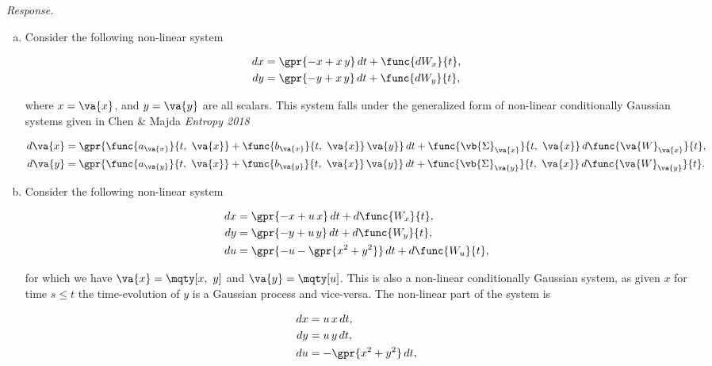\textit{Response.}

\begin{enumerate}[(a)]

	\item Consider the following non-linear system
	
	\begin{subequations}
		\begin{align}
			dx &= \gpr{-x + x\,y}\,dt + \func{dW_{x}}{t},\\
			dy &= \gpr{-y + x\,y}\,dt + \func{dW_{y}}{t},
		\end{align}
	\end{subequations}
	
	where $x = \va{x}$, and $y = \va{y}$ are all scalars. This system falls under the generalized form of non-linear conditionally Gaussian systems given in Chen \& Majda \textit{Entropy 2018}
	
	\begin{subequations}
		\begin{align}
			d\va{x} &= \gpr{\func{a_{\va{x}}}{t,\ \va{x}} + \func{b_{\va{x}}}{t,\ \va{x}}\,\va{y}}\,dt + \func{\vb{\Sigma}_{\va{x}}}{t,\ \va{x}}\,d\func{\va{W}_{\va{x}}}{t},\\
			d\va{y} &= \gpr{\func{a_{\va{y}}}{t,\ \va{x}} + \func{b_{\va{y}}}{t,\ \va{x}}\,\va{y}}\,dt + \func{\vb{\Sigma}_{\va{y}}}{t,\ \va{x}}\,d\func{\va{W}_{\va{y}}}{t}.
		\end{align}
	\end{subequations}
	
	\item Consider the following non-linear system
	
	\begin{subequations}
		\begin{align}
			dx &= \gpr{-x + u\,x}\,dt + d\func{W_{x}}{t},\\
			dy &= \gpr{-y + u\,y}\,dt + d\func{W_{y}}{t},\\
			du &= \gpr{-u - \gpr{x^2 + y^2}}\,dt + d\func{W_{u}}{t},
		\end{align}
	\end{subequations}
	
	for which we have $\va{x} = \mqty[x,\ y]$ and $\va{y} = \mqty[u]$. This is also a non-linear conditionally Gaussian system, as given $x$ for time $s \leq t$ the time-evolution of $y$ is a Gaussian process and vice-versa. The non-linear part of the system is
	
	\begin{subequations}
		\begin{align}
			dx &= u\,x\,dt,\\
			dy &= u\,y\,dt,\\
			du &= -\gpr{x^2 + y^2}\,dt,
		\end{align}
	\end{subequations}
	

\end{enumerate}
